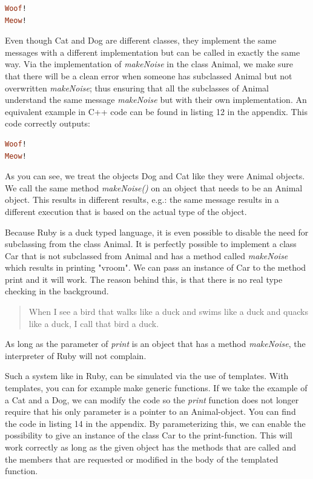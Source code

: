 \documentclass[10pt,a4paper,twocolumn]{article}
\begin{document}
\begin{lstlisting}[language=Ruby]
Woof!
Meow!
\end{lstlisting}

Even though Cat and Dog are different classes, they implement the same messages with a different implementation but can be called in exactly the same way. Via the implementation of \textit{makeNoise} in the class Animal, we make sure that there will be a clean error when someone has subclassed Animal but not overwritten \textit{makeNoise}; thus ensuring that all the subclasses of Animal understand the same message \textit{makeNoise} but with their own implementation. An equivalent example in C++ code can be found in listing 12 in the appendix. This code correctly outputs: 

\begin{lstlisting}[language=Ruby]
Woof!
Meow!
\end{lstlisting}

As you can see, we treat the objects Dog and Cat like they were Animal objects. We call the same method \textit{makeNoise()} on an object that needs to be an Animal object. This results in different results, e.g.: the same message results in a different execution that is based on the actual type of the object.

Because Ruby is a duck typed language, it is even possible to disable the need for subclassing from the class Animal. It is perfectly possible to implement a class Car that is not subclassed from Animal and has a method called \textit{makeNoise} which results in printing "vroom". We can pass an instance of Car to the method print and it will work. The reason behind this, is that there is no real type checking in the background.

\begin{quote}
When I see a bird that walks like a duck and swims like a duck and quacks like a duck, I call that bird a duck.
\end{quote}

As long as the parameter of \textit{print} is an object that has a method \textit{makeNoise}, the interpreter of Ruby will not complain.

Such a system like in Ruby, can be simulated via the use of templates. With templates, you can for example make generic functions. If we take the example of a Cat and a Dog, we can modify the code so the \textit{print} function does not longer require that his only parameter is a pointer to an Animal-object. You can find the code in listing 14 in the appendix. By parameterizing this, we can enable the possibility to give an instance of the class Car to the print-function. This will work correctly as long as the given object has the methods that are called and the members that are requested or modified in the body of the templated function.
\end{document}
